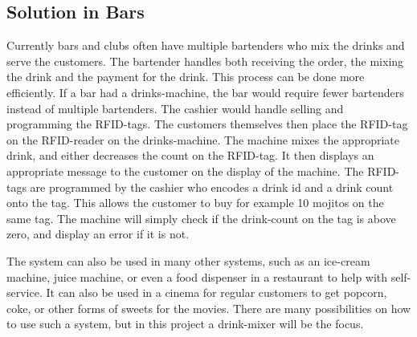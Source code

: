 \subsection{Solution in Bars}
\label{SolutionInBars}
Currently bars and clubs often have multiple bartenders who mix the drinks and serve the customers. The bartender handles both receiving the order, the mixing the drink and the payment for the drink. This process can be done more efficiently. If a bar had a drinks-machine, the bar would require fewer bartenders instead of multiple bartenders. The cashier would handle selling and programming the RFID-tags. The customers themselves then place the RFID-tag on the RFID-reader on the drinks-machine. The machine mixes the appropriate drink, and either decreases the count on the RFID-tag. It then displays an appropriate message to the customer on the display of the machine. The RFID-tags are programmed by the cashier who encodes a drink id and a drink count onto the tag. This allows the customer to buy for example 10 mojitos on the same tag. The machine will simply check if the drink-count on the tag is above zero, and display an error if it is not.

The system can also be used in many other systems, such as an ice-cream machine, juice machine, or even a food dispenser in a restaurant to help with self-service. It can also be used in a cinema for regular customers to get popcorn, coke, or other forms of sweets for the movies. There are many possibilities on how to use such a system, but in this project a drink-mixer will be the focus.
